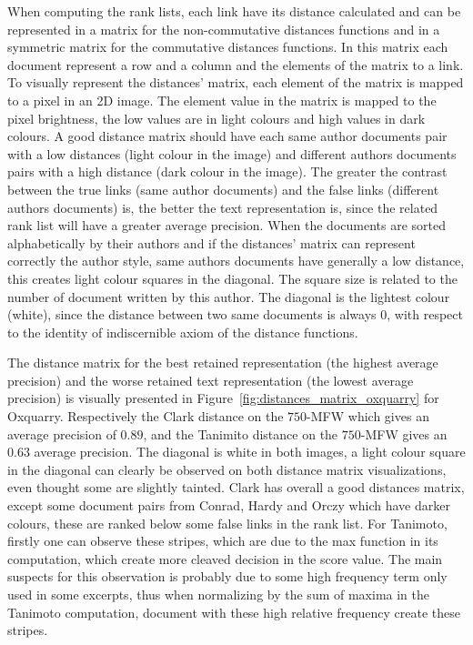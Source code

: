When computing the rank lists, each link have its distance calculated and can be represented in a matrix for the non-commutative distances functions and in a symmetric matrix for the commutative distances functions.
In this matrix each document represent a row and a column and the elements of the matrix to a link.
To visually represent the distances' matrix, each element of the matrix is mapped to a pixel in an 2D image.
The element value in the matrix is mapped to the pixel brightness, the low values are in light colours and high values in dark colours.
A good distance matrix should have each same author documents pair with a low distances (light colour in the image) and different authors documents pairs with a high distance (dark colour in the image).
The greater the contrast between the true links (same author documents) and the false links (different authors documents) is, the better the text representation is, since the related rank list will have a greater average precision.
When the documents are sorted alphabetically by their authors and if the distances' matrix can represent correctly the author style, same authors documents have generally a low distance, this creates light colour squares in the diagonal.
The square size is related to the number of document written by this author.
The diagonal is the lightest colour (white), since the distance between two same documents is always 0, with respect to the identity of indiscernible axiom of the distance functions.

The distance matrix for the best retained representation (the highest average precision) and the worse retained text representation (the lowest average precision) is visually presented in Figure~\ref{fig:distances_matrix_oxquarry} for Oxquarry.
Respectively the Clark distance on the $750$-MFW which gives an average precision of $0.89$, and the Tanimito distance on the $750$-MFW gives an $0.63$ average precision.
The diagonal is white in both images, a light colour square in the diagonal can clearly be observed on both distance matrix visualizations, even thought some are slightly tainted.
Clark has overall a good distances matrix, except some document pairs from Conrad, Hardy and Orczy which have darker colours, these are ranked below some false links in the rank list.
For Tanimoto, firstly one can observe these stripes, which are due to the max function in its computation, which create more cleaved decision in the score value.
The main suspects for this observation is probably due to some high frequency term only used in some excerpts, thus when normalizing by the sum of maxima in the Tanimoto computation, document with these high relative frequency create these stripes.

